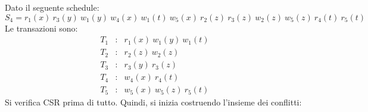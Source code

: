 \documentclass[a4paper]{article}
\begin{document}
	Dato il seguente schedule:
	\begin{equation*}
		S_{4} = r_{1}\left(x\right) \: r_{3}\left(y\right) \: w_{1}\left(y\right) \: w_{4}\left(x\right) \: w_{1}\left(t\right) \: w_{5}\left(x\right) \: r_{2}\left(z\right) \: r_{3}\left(z\right) \: w_{2}\left(z\right) \: w_{5}\left(z\right) \: r_{4}\left(t\right) \: r_{5}\left(t\right)
	\end{equation*}
	Le transazioni sono:
	\begin{equation*}
		\begin{array}{lll}
			T_{1} &:& r_{1}\left(x\right) \: w_{1}\left(y\right) \: w_{1}\left(t\right) \\
			T_{2} &:& r_{2}\left(z\right) \: w_{2}\left(z\right) \\
			T_{3} &:& r_{3}\left(y\right) \: r_{3}\left(z\right) \\
			T_{4} &:& w_{4}\left(x\right) \: r_{4}\left(t\right) \\
			T_{5} &:& w_{5}\left(x\right) \: w_{5}\left(z\right) \: r_{5}\left(t\right)
		\end{array}
	\end{equation*}
	Si verifica CSR prima di tutto. Quindi, si inizia costruendo l'insieme dei conflitti:
\end{document}
